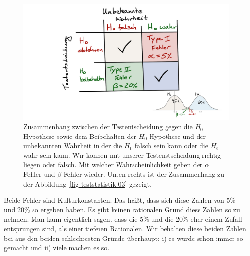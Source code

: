 \documentclass[
  letterpaper,
  DIV=11,
  oneside]{scrreport}
\begin{document}
\begin{figure}

{\centering \includegraphics{./images/t-verteilung_04.png}

}

\caption{\label{fig-teststatistik-04}Zusammenhang zwischen der
Testentscheidung gegen die \(H_0\) Hypothese sowie dem Beibehalten der
\(H_0\) Hypothese und der unbekannten Wahrheit in der die \(H_0\) falsch
sein kann oder die \(H_0\) wahr sein kann. Wir können mit unserer
Testenstscheidung richtig liegen oder falsch. Mit welcher
Wahrscheinlichkeit geben der \(\alpha\) Fehler und \(\beta\) Fehler
wieder. Unten rechts ist der Zusammenhang zu der
Abbildung~\ref{fig-teststatistik-03} gezeigt.}

\end{figure}


Beide Fehler sind Kulturkonstanten. Das heißt, dass sich diese Zahlen
von 5\% und 20\% so ergeben haben. Es gibt keinen rationalen Grund diese
Zahlen so zu nehmen. Man kann eigentlich sagen, dass die 5\% und die
20\% eher einem Zufall entsprungen sind, als einer tieferen Rationalen.
Wir behalten diese beiden Zahlen bei aus den beiden schlechtesten Gründe
überhaupt: i) es wurde schon immer so gemacht und ii) viele machen es
so.
\end{document}
